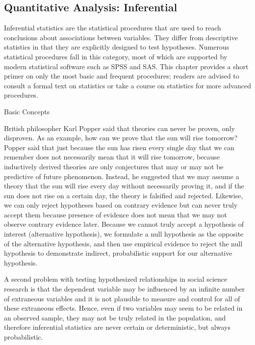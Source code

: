 \subsection{Quantitative Analysis: Inferential}
Inferential statistics are the statistical procedures that are used to reach conclusions about associations between variables. They differ from descriptive statistics in that they are explicitly designed to test hypotheses. Numerous statistical procedures fall in this category, most of which are supported by modern statistical software such as SPSS and SAS. This chapter provides a short primer on only the most basic and frequent procedures; readers are advised to consult a formal text on statistics or take a course on statistics for more advanced procedures.

Basic Concepts

British philosopher Karl Popper said that theories can never be proven, only disproven. As an example, how can we prove that the sun will rise tomorrow? Popper said that just because the sun has risen every single day that we can remember does not necessarily mean that it will rise tomorrow, because inductively derived theories are only conjectures that may or may not be predictive of future phenomenon. Instead, he suggested that we may assume a theory that the sun will rise every day without necessarily proving it, and if the sun does not rise on a certain day, the theory is falsified and rejected. Likewise, we can only reject hypotheses based on contrary evidence but can never truly accept them because presence of evidence does not mean that we may not observe contrary evidence later. Because we cannot truly accept a hypothesis of interest (alternative hypothesis), we formulate a null hypothesis as the opposite of the alternative hypothesis, and then use empirical evidence to reject the null hypothesis to demonstrate indirect, probabilistic support for our alternative hypothesis. 

A second problem with testing hypothesized relationships in social science research is that the dependent variable may be influenced by an infinite number of extraneous variables and it is not plausible to measure and control for all of these extraneous effects. Hence, even if two variables may seem to be related in an observed sample, they may not be truly related in the population, and therefore inferential statistics are never certain or deterministic, but always probabilistic.


